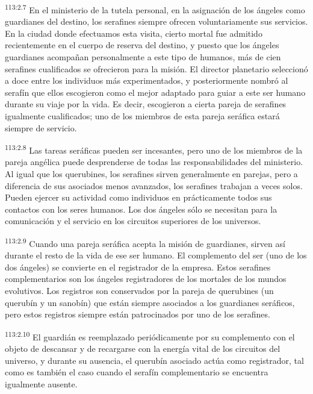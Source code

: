 \documentclass[twoside, 11pt]{book}
\begin{document}
\par
\textsuperscript{113:2.7} En el ministerio de la tutela personal, en la asignación de los ángeles como guardianes del destino, los serafines siempre ofrecen voluntariamente sus servicios. En la ciudad donde efectuamos esta visita, cierto mortal fue admitido recientemente en el cuerpo de reserva del destino, y puesto que los ángeles guardianes acompañan personalmente a este tipo de humanos, más de cien serafines cualificados se ofrecieron para la misión. El director planetario seleccionó a doce entre los individuos más experimentados, y posteriormente nombró al serafín que ellos escogieron como el mejor adaptado para guiar a este ser humano durante su viaje por la vida. Es decir, escogieron a cierta pareja de serafines igualmente cualificados; uno de los miembros de esta pareja seráfica estará siempre de servicio.

\par
\textsuperscript{113:2.8} Las tareas seráficas pueden ser incesantes, pero uno de los miembros de la pareja angélica puede desprenderse de todas las responsabilidades del ministerio. Al igual que los querubines, los serafines sirven generalmente en parejas, pero a diferencia de sus asociados menos avanzados, los serafines trabajan a veces solos. Pueden ejercer su actividad como individuos en prácticamente todos sus contactos con los seres humanos. Los dos ángeles sólo se necesitan para la comunicación y el servicio en los circuitos superiores de los universos.

\par
\textsuperscript{113:2.9} Cuando una pareja seráfica acepta la misión de guardianes, sirven así durante el resto de la vida de ese ser humano. El complemento del ser (uno de los dos ángeles) se convierte en el registrador de la empresa. Estos serafines complementarios son los ángeles registradores de los mortales de los mundos evolutivos. Los registros son conservados por la pareja de querubines (un querubín y un sanobín) que están siempre asociados a los guardianes seráficos, pero estos registros siempre están patrocinados por uno de los serafines.

\par
\textsuperscript{113:2.10} El guardián es reemplazado periódicamente por su complemento con el objeto de descansar y de recargarse con la energía vital de los circuitos del universo, y durante su ausencia, el querubín asociado actúa como registrador, tal como es también el caso cuando el serafín complementario se encuentra igualmente ausente.
\end{document}
